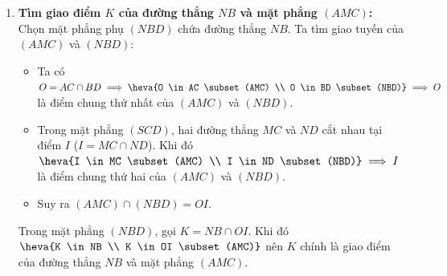 \begin{ex}
{\begin{enumerate}[1.]
			\begin{itemize}
				\item Vì $ABCD$ là hình bình hành tâm $O$ nên $O$ là trung điểm của $BD$.
				\item Xét tam giác $SBD$ có $O$ là trung điểm của $BD$ và $M$ là trung điểm của $SD$, suy ra $OM$ là đường trung bình của tam giác $SBD \implies OM \parallel SB$.
				\item Mà $\heva{SB &\subset (SAB) \\ OM &\not\subset (SAB)}$ nên $OM \parallel (SAB)$.
			\end{itemize}
			\item \textbf{Tìm giao điểm $K$ của đường thẳng $NB$ và mặt phẳng $(AMC)$:}\\
			Chọn mặt phẳng phụ $(NBD)$ chứa đường thẳng $NB$. Ta tìm giao tuyến của $(AMC)$ và $(NBD)$:
			\begin{itemize}
				\item Ta có $O = AC \cap BD \implies \heva{O \in AC \subset (AMC) \\ O \in BD \subset (NBD)} \implies O$ là điểm chung thứ nhất của $(AMC)$ và $(NBD)$.
				\item Trong mặt phẳng $(SCD)$, hai đường thẳng $MC$ và $ND$ cắt nhau tại điểm $I$ ($I = MC \cap ND$). Khi đó $\heva{I \in MC \subset (AMC) \\ I \in ND \subset (NBD)} \implies I$ là điểm chung thứ hai của $(AMC)$ và $(NBD)$.
				\item Suy ra $(AMC) \cap (NBD) = OI$.
			\end{itemize}
			Trong mặt phẳng $(NBD)$, gọi $K = NB \cap OI$. Khi đó $\heva{K \in NB \\ K \in OI \subset (AMC)}$ nên $K$ chính là giao điểm của đường thẳng $NB$ và mặt phẳng $(AMC)$.
		\end{enumerate}
	}
\end{ex}
